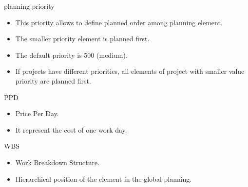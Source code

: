 \documentclass[letterpaper,10pt,english]{sphinxmanual}
\begin{document}
\begin{description}
\item[{planning priority}] \leavevmode{}\label{Glossary:term-planning-priority}
\end{description}
\begin{itemize}
\item {} 
This priority allows to define planned order among planning element.

\item {} 
The smaller priority element is planned first.

\item {} 
The default priority is 500 (medium).

\item {} 
If projects have different priorities, all elements of project with smaller value priority are planned first.

\end{itemize}
\begin{description}
\item[{PPD}] \leavevmode{}\label{Glossary:term-ppd}
\end{description}
\begin{itemize}
\item {} 
Price Per Day.

\item {} 
It represent the cost of one work day.

\end{itemize}
\begin{description}
\item[{WBS}] \leavevmode{}\label{Glossary:term-wbs}
\end{description}
\begin{itemize}
\item {} 
Work Breakdown Structure.

\item {} 
Hierarchical position of the element in the global planning.

\end{itemize}



\renewcommand{\indexname}{Index}
\printindex
\end{document}
